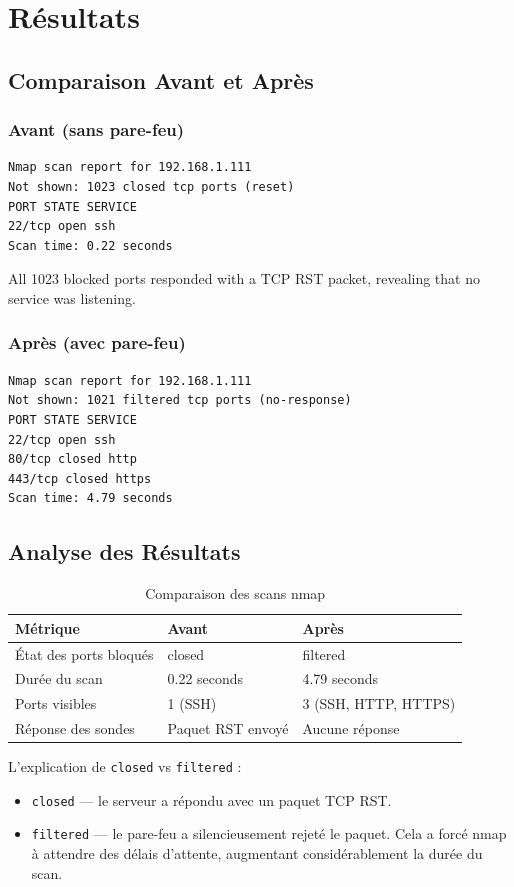 \chapter{Résultats}
\section{Comparaison Avant et Après}
\subsection{Avant (sans pare-feu)}
\begin{lstlisting}
Nmap scan report for 192.168.1.111
Not shown: 1023 closed tcp ports (reset)
PORT STATE SERVICE
22/tcp open ssh
Scan time: 0.22 seconds
\end{lstlisting}
All 1023 blocked ports responded with a TCP RST packet, revealing that no service was listening.

\subsection{Après (avec pare-feu)}
\begin{lstlisting}
Nmap scan report for 192.168.1.111
Not shown: 1021 filtered tcp ports (no-response)
PORT STATE SERVICE
22/tcp open ssh
80/tcp closed http
443/tcp closed https
Scan time: 4.79 seconds
\end{lstlisting}

\section{Analyse des Résultats}
\begin{table}[h!]
\centering
\begin{tabular}{|l|l|l|}
\hline
\textbf{Métrique} & \textbf{Avant} & \textbf{Après} \\
\hline
État des ports bloqués & closed & filtered \\
Durée du scan & 0.22 seconds & 4.79 seconds \\
Ports visibles & 1 (SSH) & 3 (SSH, HTTP, HTTPS) \\
Réponse des sondes & Paquet RST envoyé & Aucune réponse \\
\hline
\end{tabular}
\caption{Comparaison des scans nmap}
\label{tab:nmap_comparison}
\end{table}

L'explication de \texttt{closed} vs \texttt{filtered} :
\begin{itemize}
    \item \texttt{closed} — le serveur a répondu avec un paquet TCP RST.
    \item \texttt{filtered} — le pare-feu a silencieusement rejeté le paquet. Cela a forcé nmap à attendre des délais d'attente, augmentant considérablement la durée du scan.
\end{itemize}
\lipsum[8]
